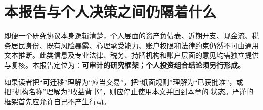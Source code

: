 \section{本报告与个人决策之间仍隔着什么}

即便一个研究协议本身逻辑清楚，个人层面的资产负债表、近期开支、现金流、税务居民身份、既有风险暴露、心理承受能力、账户权限和法律约束仍然不可由通用文本推断。此类信息及专业法律、税务、持牌机构和账户层面的意见均需独立提供与复核。本报告定位为：\textbf{可审计的研究框架；个人投资组合结论须另行形成。}

\begin{riskbox}[误用警报]
如果读者把“可迁移”理解为“应当交易”，把“纸面规则”理解为“已获批准”，或把“机构名称”理解为“收益背书”，则应停止使用本文并回到本章的 \qzero{} 状态。严谨的框架首先应允许自己不产生行动。
\end{riskbox}
